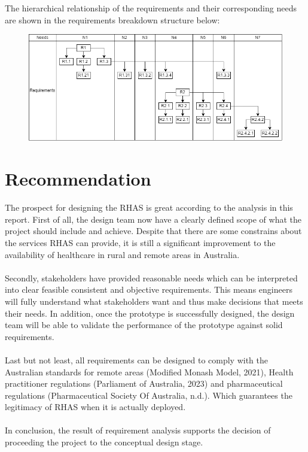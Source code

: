 \documentclass{article}
\begin{document}
The hierarchical relationship of the requirements and their corresponding needs are shown in the requirements breakdown structure below:
\begin{figure}[h]
    \centering
    \includegraphics[scale=0.5]{RBS}
    \label{1-2-a}
\end{figure}
\section{Recommendation}
The prospect for designing the RHAS is great according to the analysis in this report. First of all, the design team now have a clearly defined scope of what the project should include and achieve. Despite that there are some constrains about the services RHAS can provide, it is still a significant improvement to the availability of healthcare in rural and remote areas in Australia. \\\\
Secondly, stakeholders have provided reasonable needs which can be interpreted into clear feasible consistent and objective requirements. This means engineers will fully understand what stakeholders want and thus make decisions that meets their needs. In addition, once the prototype is successfully designed, the design team will be able to validate the performance of the prototype against solid requirements.\\\\
Last but not least, all requirements can be designed to comply with the Australian standards for remote areas (Modified Monash Model, 2021), Health practitioner regulations (Parliament of Australia, 2023) and pharmaceutical regulations (Pharmaceutical Society Of Australia, n.d.). Which guarantees the legitimacy of RHAS when it is actually deployed.\\\\
In conclusion, the result of requirement analysis  supports the decision of proceeding the project to the conceptual design stage.
\setcounter{secnumdepth}{0}
\end{document}
